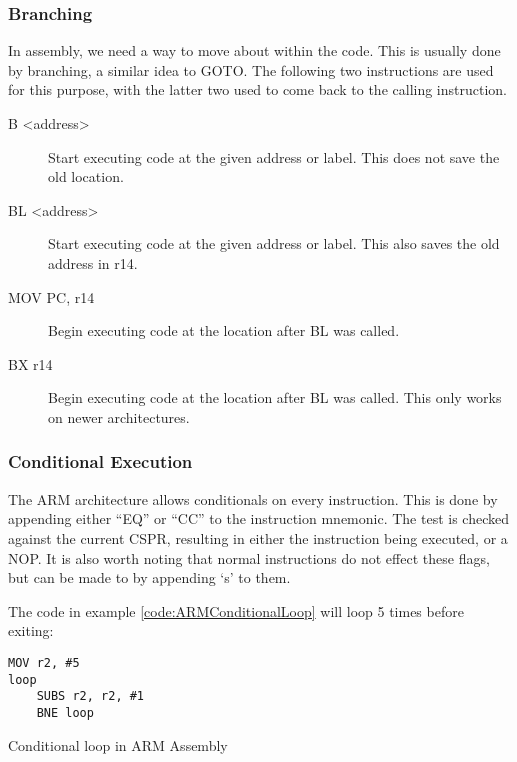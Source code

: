 			\subsubsection{Branching}
				In assembly, we need a way to move about within the code.
				This is usually done by branching, a similar idea to GOTO.
				The following two instructions are used for this purpose, with the latter two used to come back to the calling instruction.
				\begin{description}
					\item[B <address>] Start executing code at the given address or label.
						This does not save the old location.
					\item[BL <address>] Start executing code at the given address or label.
						This also saves the old address in r14.
					\item[MOV PC, r14] Begin executing code at the location after BL was called.
					\item[BX r14] Begin executing code at the location after BL was called.
						This only works on newer architectures.
				\end{description}

			\subsubsection{Conditional Execution}
				The ARM architecture allows conditionals on every instruction.
				This is done by appending either ``EQ'' or ``CC'' to the instruction mnemonic.
				The test is checked against the current CSPR, resulting in either the instruction being executed, or a NOP.
				It is also worth noting that normal instructions do not effect these flags, but can be made to by appending `s' to them.

				The code in example \ref{code:ARMConditionalLoop} will loop 5 times before exiting:
				\begin{code}
					\begin{lstlisting}[language={[ARM]assembler}]
	MOV r2, #5
loop
	SUBS r2, r2, #1
	BNE loop
					\end{lstlisting}
					\caption{Conditional loop in ARM Assembly}
					\label{code:ARMConditionalLoop}
				\end{code}

